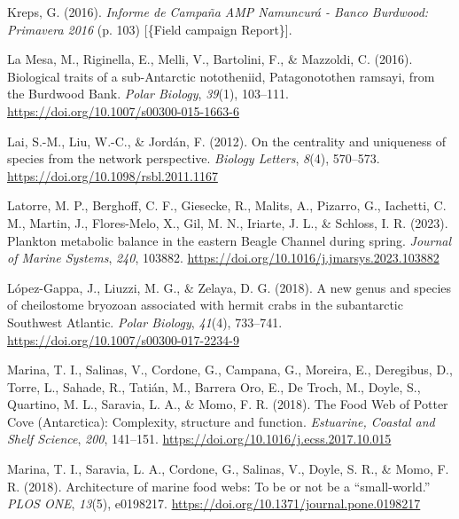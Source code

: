 \documentclass[preprint, 3p,
authoryear]{elsarticle} %
\newlength{\cslhangindent}
\newlength{\cslentryspacingunit} %
\newenvironment{CSLReferences}[2] %
 {%
  \setlength{\parindent}{0pt}
  \ifodd #1
  \let\oldpar\par
  \def\par{\hangindent=\cslhangindent\oldpar}
  \fi
  \setlength{\parskip}{#2\cslentryspacingunit}
 }%
 {}
\begin{document}
\begin{CSLReferences}{1}{0}
\leavevmode{}%
Kreps, G. (2016). \emph{{Informe de Campaña AMP Namuncurá - Banco
Burdwood: Primavera 2016}} (p. 103) {[}\{Field campaign Report\}{]}.

\leavevmode{}%
La Mesa, M., Riginella, E., Melli, V., Bartolini, F., \& Mazzoldi, C.
(2016). Biological traits of a sub-{Antarctic} nototheniid,
{Patagonotothen} ramsayi, from the {Burdwood Bank}. \emph{Polar
Biology}, \emph{39}(1), 103--111.
\url{https://doi.org/10.1007/s00300-015-1663-6}

\leavevmode{}%
Lai, S.-M., Liu, W.-C., \& Jordán, F. (2012). On the centrality and
uniqueness of species from the network perspective. \emph{Biology
Letters}, \emph{8}(4), 570--573.
\url{https://doi.org/10.1098/rsbl.2011.1167}

\leavevmode{}%
Latorre, M. P., Berghoff, C. F., Giesecke, R., Malits, A., Pizarro, G.,
Iachetti, C. M., Martin, J., Flores-Melo, X., Gil, M. N., Iriarte, J.
L., \& Schloss, I. R. (2023). Plankton metabolic balance in the eastern
{Beagle Channel} during spring. \emph{Journal of Marine Systems},
\emph{240}, 103882. \url{https://doi.org/10.1016/j.jmarsys.2023.103882}

\leavevmode{}%
López-Gappa, J., Liuzzi, M. G., \& Zelaya, D. G. (2018). A new genus and
species of cheilostome bryozoan associated with hermit crabs in the
subantarctic {Southwest Atlantic}. \emph{Polar Biology}, \emph{41}(4),
733--741. \url{https://doi.org/10.1007/s00300-017-2234-9}

\leavevmode{}%
Marina, T. I., Salinas, V., Cordone, G., Campana, G., Moreira, E.,
Deregibus, D., Torre, L., Sahade, R., Tatián, M., Barrera Oro, E., De
Troch, M., Doyle, S., Quartino, M. L., Saravia, L. A., \& Momo, F. R.
(2018). The {Food Web} of {Potter Cove} ({Antarctica}): Complexity,
structure and function. \emph{Estuarine, Coastal and Shelf Science},
\emph{200}, 141--151. \url{https://doi.org/10.1016/j.ecss.2017.10.015}

\leavevmode{}%
Marina, T. I., Saravia, L. A., Cordone, G., Salinas, V., Doyle, S. R.,
\& Momo, F. R. (2018). Architecture of marine food webs: {To} be or not
be a {``small-world.''} \emph{PLOS ONE}, \emph{13}(5), e0198217.
\url{https://doi.org/10.1371/journal.pone.0198217}


\end{CSLReferences}
\end{document}
